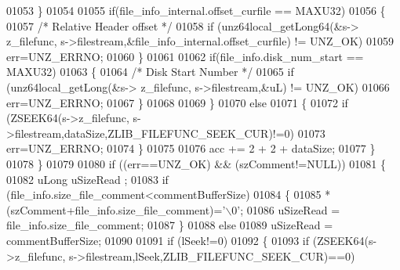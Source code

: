 \begin{DoxyCode}
01053                                                                 \}
01054 
01055                                                                 \textcolor{keywordflow}{if}(file\_info\_internal.offset\_curfile == 
      MAXU32)
01056                                                                 \{
01057                                                                         \textcolor{comment}{/* Relative Header offset */}
01058                                                                         \textcolor{keywordflow}{if} (unz64local\_getLong64(&s->
      z\_filefunc, s->filestream,&file\_info\_internal.offset\_curfile) != UNZ\_OK)
01059                                                                                 err=UNZ\_ERRNO;
01060                                                                 \}
01061 
01062                                                                 \textcolor{keywordflow}{if}(file\_info.disk\_num\_start == MAXU32)
01063                                                                 \{
01064                                                                         \textcolor{comment}{/* Disk Start Number */}
01065                                                                         \textcolor{keywordflow}{if} (unz64local\_getLong(&s->
      z\_filefunc, s->filestream,&uL) != UNZ\_OK)
01066                                                                                 err=UNZ\_ERRNO;
01067                                                                 \}
01068 
01069             \}
01070             \textcolor{keywordflow}{else}
01071             \{
01072                 \textcolor{keywordflow}{if} (ZSEEK64(s->z\_filefunc, s->filestream,dataSize,ZLIB\_FILEFUNC\_SEEK\_CUR)!=0)
01073                     err=UNZ\_ERRNO;
01074             \}
01075 
01076             acc += 2 + 2 + dataSize;
01077         \}
01078     \}
01079 
01080     \textcolor{keywordflow}{if} ((err==UNZ\_OK) && (szComment!=NULL))
01081     \{
01082         uLong uSizeRead ;
01083         \textcolor{keywordflow}{if} (file\_info.size\_file\_comment<commentBufferSize)
01084         \{
01085             *(szComment+file\_info.size\_file\_comment)=\textcolor{charliteral}{'\(\backslash\)0'};
01086             uSizeRead = file\_info.size\_file\_comment;
01087         \}
01088         \textcolor{keywordflow}{else}
01089             uSizeRead = commentBufferSize;
01090 
01091         \textcolor{keywordflow}{if} (lSeek!=0)
01092         \{
01093             \textcolor{keywordflow}{if} (ZSEEK64(s->z\_filefunc, s->filestream,lSeek,ZLIB\_FILEFUNC\_SEEK\_CUR)==0)

\end{DoxyCode}
